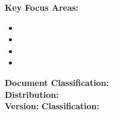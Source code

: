 \vspace{0.4in}

\covertitle{\TitlePlaceholder}

\vspace{0.2in}
\coverrule
\vspace{0.3in}

\coversubtitle{\SubtitlePlaceholder}

\vspace{0.6in}

\begin{coverinfobox}
\textbf{\large \SummaryTitlePlaceholder}

\vspace{8pt}

\SummaryTextPlaceholder

\vspace{8pt}

\textbf{Key Focus Areas:}
\begin{itemize}
    \item \FocusItemOne
    \item \FocusItemTwo
    \item \FocusItemThree
    \item \FocusItemFour
\end{itemize}
\end{coverinfobox}

\vspace{0.8in}

\coverauthor{\AuthorPlaceholder}

\vspace{0.2in}

\begin{center}
\color{accent}
\fontsize{16}{20}\selectfont\bfseries\sffamily
\DatePlaceholder
\end{center}

\vfill

\begin{center}
\end{center}

\vspace{0.3in}

\begin{classificationbox}
\centering
\footnotesize\sffamily
\textbf{Document Classification:} \ClassificationPlaceholder\\
\textbf{Distribution:} \DistributionPlaceholder\\
\textbf{Version:} \VersionPlaceholder \quad 
\textbf{Classification:} \ClassificationLevelPlaceholder
\end{classificationbox} 